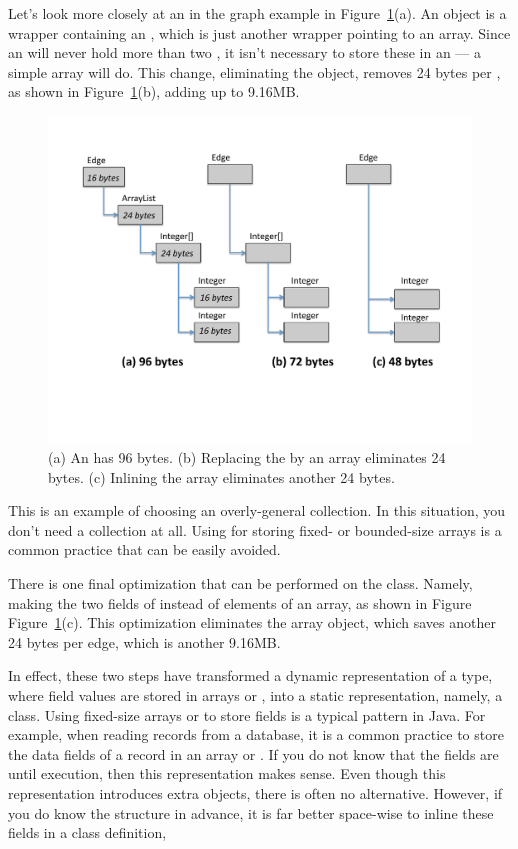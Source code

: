 Let's look more closely at an  in the graph example in
Figure~\ref{fig:edges}(a). An  object is a wrapper containing an
 , which is just another
wrapper pointing to an  array. 
Since an  will never hold more than two , it isn't 
necessary to store these in an  --- a simple array will do.
This change, eliminating the  object, removes 24 bytes per
, as shown in Figure~\ref{fig:edges}(b), adding up to 9.16MB.
\begin{figure}
  \centering
 \includegraphics[width=.80\textwidth]{part1/Figures/collections/Edges.pdf}
  \caption{(a) An  has 96 bytes. (b) Replacing the
   by an array eliminates 24 bytes. (c) Inlining the array
  eliminates another 24 bytes.}
  \label{fig:edges}
\end{figure}
This is an example of choosing an overly-general collection. In
this situation, you don't need a collection at all. Using 
for storing fixed- or bounded-size arrays is a
common practice that can be easily avoided.

There is one final optimization that can be performed on the 
class. Namely, making the two  fields of  instead
of elements of an array, as shown in Figure
Figure~\ref{fig:edges}(c). This optimization eliminates the
array object, which saves another 24 bytes per edge, which is another 9.16MB.


In effect, these two steps have
transformed a dynamic representation of a type, where field values are stored in
arrays or , into a static representation, namely, a class.
Using fixed-size arrays or  to store fields is a typical
pattern in Java. For example, when reading records from a database, it is a
common practice to store the data fields of a record in an array or
. If you do not know that the fields are until execution, then
this representation makes sense. 
Even though this representation introduces extra objects, there is often no alternative.
However, if you do know the structure in advance, it is far better space-wise
to inline these fields in a class definition,

